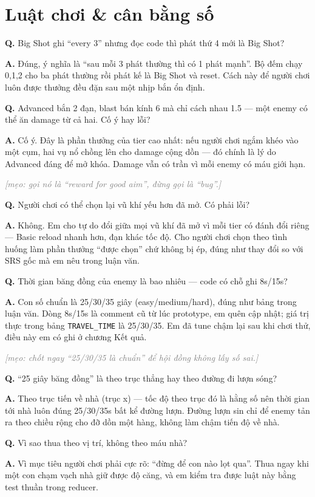 \documentclass[12pt,a4paper]{article}
\newcommand{\QA}[2]{%
  \par\medskip\noindent\textbf{\textcolor{blue!60!black}{Q.}} #1\par
  \smallskip\noindent\textbf{\textcolor{green!45!black}{A.}} #2\par}
\newcommand{\tip}[1]{\par\smallskip\noindent%
  \textit{\textcolor{gray}{[mẹo: #1]}}\par}
\begin{document}
\section{Luật chơi \& cân bằng số}

\QA{Big Shot ghi ``every 3'' nhưng đọc code thì phát thứ 4 mới là Big Shot?}
{Đúng, ý nghĩa là ``sau mỗi 3 phát thường thì có 1 phát mạnh''. Bộ đếm chạy
0,1,2 cho ba phát thường rồi phát kế là Big Shot và reset. Cách này để người chơi
luôn được thưởng đều đặn sau một nhịp bắn ổn định.}

\QA{Advanced bắn 2 đạn, blast bán kính 6 mà chỉ cách nhau 1.5 --- một enemy có thể
ăn damage từ cả hai. Cố ý hay lỗi?}
{Cố ý. Đây là phần thưởng của tier cao nhất: nếu người chơi ngắm khéo vào một cụm,
hai vụ nổ chồng lên cho damage cộng dồn --- đó chính là lý do Advanced đáng để
mở khóa. Damage vẫn có trần vì mỗi enemy có máu giới hạn.}
\tip{gọi nó là ``reward for good aim'', đừng gọi là ``bug''.}

\QA{Người chơi có thể chọn lại vũ khí yếu hơn đã mở. Có phải lỗi?}
{Không. Em cho tự do đổi giữa mọi vũ khí đã mở vì mỗi tier có đánh đổi riêng ---
Basic reload nhanh hơn, đạn khác tốc độ. Cho người chơi chọn theo tình huống làm
phần thưởng ``được chọn'' chứ không bị ép, đúng như thay đổi so với SRS gốc mà em
nêu trong luận văn.}

\QA{Thời gian băng đồng của enemy là bao nhiêu --- code có chỗ ghi 8s/15s?}
{Con số chuẩn là 25/30/35 giây (easy/medium/hard), đúng như bảng trong luận văn.
Dòng 8s/15s là comment cũ từ lúc prototype, em quên cập nhật; giá trị thực trong
bảng \texttt{TRAVEL\_TIME} là 25/30/35. Em đã tune chậm lại sau khi chơi thử,
điều này em có ghi ở chương Kết quả.}
\tip{chốt ngay ``25/30/35 là chuẩn'' để hội đồng không lấy số sai.}

\QA{``25 giây băng đồng'' là theo trục thẳng hay theo đường đi lượn sóng?}
{Theo trục tiến về nhà (trục x) --- tốc độ theo trục đó là hằng số nên thời gian
tới nhà luôn đúng 25/30/35s bất kể đường lượn. Đường lượn sin chỉ để enemy tản ra
theo chiều rộng cho đỡ dồn một hàng, không làm chậm tiến độ về nhà.}

\QA{Vì sao thua theo vị trí, không theo máu nhà?}
{Vì mục tiêu người chơi phải cực rõ: ``đừng để con nào lọt qua''. Thua ngay khi
một con chạm vạch nhà giữ được độ căng, và em kiểm tra được luật này bằng test
thuần trong reducer.}
\end{document}
